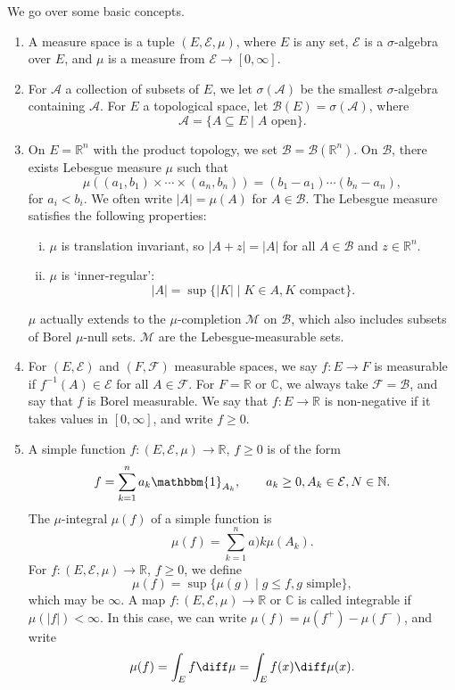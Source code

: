 \documentclass[12pt]{article}
\begin{document}
We go over some basic concepts.
\begin{enumerate}
	\item A measure space is a tuple $(E, \mathcal{E}, \mu)$, where $E$ is any set, $\mathcal{E}$ is a $\sigma$-algebra over $E$, and $\mu$ is a measure from $\mathcal{E} \to [0, \infty]$.
	\item For $\mathcal{A}$ a collection of subsets of $E$, we let $\sigma(\mathcal{A})$ be the smallest $\sigma$-algebra containing $\mathcal{A}$. For $E$ a topological space, let $\mathcal{B}(E) = \sigma(\mathcal{A})$, where
	\[
		\mathcal{A} = \{A \subseteq E \mid A \text{ open}\}.
	\]
	\item On $E = \mathbb{R}^n$ with the product topology, we set $\mathcal{B} = \mathcal{B}(\mathbb{R}^{n})$. On $\mathcal{B}$, there exists Lebesgue measure $\mu$ such that
		 \[
		\mu((a_1, b_1) \times \cdots \times (a_n, b_n)) = (b_1 - a_1) \cdots (b_n - a_n),
		\]
		for $a_i < b_i$. We often write $|A| = \mu(A)$ for $A \in \mathcal{B}$. The Lebesgue measure satisfies the following properties:
		\begin{enumerate}[(i)]
			\item $\mu$ is translation invariant, so $|A + z| = |A|$ for all $A \in \mathcal{B}$ and $z \in \mathbb{R}^n$.
			\item $\mu$ is `inner-regular':
				\[
					|A| = \sup\{|K| \mid K \in A, K \text{ compact}\}.
				\]
		\end{enumerate}
		$\mu$ actually extends to the $\mu$-completion $\mathcal{M}$ on $\mathcal{B}$, which also includes subsets of Borel $\mu$-null sets. $\mathcal{M}$ are the Lebesgue-measurable sets.
	\item For $(E, \mathcal{E})$ and $(F, \mathcal{F})$ measurable spaces, we say $f : E \to F$ is measurable if $f^{-1}(A) \in \mathcal{E}$ for all $A \in \mathcal{F}$. For $F = \mathbb{R}$ or $\mathbb{C}$, we always take $\mathcal{F} = \mathcal{B}$, and say that $f$ is Borel measurable. We say that $f : E \to \mathbb{R}$ is non-negative if it takes values in $[0, \infty]$, and write $f \geq 0$.
	\item A simple function $f : (E, \mathcal{E}, \mu) \to \mathbb{R}$, $f \geq 0$ is of the form
		\[
		f = \sum_{k = 1}^n a_k \mathbbm{1}_{A_k}, \qquad a_k \geq 0, A_k \in \mathcal{E}, N \in \mathbb{N}.
		\]
		The $\mu$-integral $\mu(f)$ of a simple function is
		\[
		\mu(f) = \sum_{k = 1}^n a)k \mu(A_k).
		\]
		For $f : (E, \mathcal{E}, \mu) \to \mathbb{R}$, $f \geq 0$, we define
		\[
			\mu(f) = \sup\{\mu(g) \mid g \leq f, g \text{ simple}\},
		\]
		which may be $\infty$. A map $f : (E, \mathcal{E}, \mu) \to \mathbb{R}$ or $\mathbb{C}$ is called integrable if $\mu(|f|) < \infty$. In this case, we can write $\mu(f) = \mu(f^+) - \mu(f^-)$, and write
		\[
		\mu(f) = \int_E f \diff \mu = \int_E f(x) \diff \mu(x).
		\]
\end{enumerate}
\end{document}
